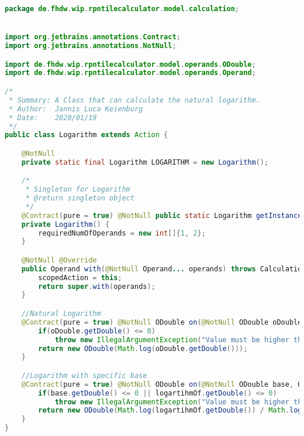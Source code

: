 \begin{lstlisting}[caption=Logarithm (Keienburg),label=list:Logarithm,language=Java]
package de.fhdw.wip.rpntilecalculator.model.calculation;


import org.jetbrains.annotations.Contract;
import org.jetbrains.annotations.NotNull;

import de.fhdw.wip.rpntilecalculator.model.operands.ODouble;
import de.fhdw.wip.rpntilecalculator.model.operands.Operand;

/*
 * Summary: A Class that can calculate the natural logarithm.
 * Author:  Jannis Luca Keienburg
 * Date:    2020/01/19
 */
public class Logarithm extends Action {

    @NotNull
    private static final Logarithm LOGARITHM = new Logarithm();

    /*
     * Singleton for Logarithm
     * @return singleton object
     */
    @Contract(pure = true) @NotNull public static Logarithm getInstance() { return LOGARITHM; }
    private Logarithm() {
        requiredNumOfOperands = new int[]{1, 2};
    }

    @NotNull @Override
    public Operand with(@NotNull Operand... operands) throws CalculationException {
        scopedAction = this;
        return super.with(operands);
    }

    //Natural Logarithm
    @Contract(pure = true) @NotNull ODouble on(@NotNull ODouble oDouble) {
        if(oDouble.getDouble() <= 0)
            throw new IllegalArgumentException("Value must be higher than Zero.");
        return new ODouble(Math.log(oDouble.getDouble()));
    }

    //Logarithm with specific base
    @Contract(pure = true) @NotNull ODouble on(@NotNull ODouble base, ODouble logartihmOf) {
        if(base.getDouble() <= 0 || logartihmOf.getDouble() <= 0)
            throw new IllegalArgumentException("Value must be higher than Zero.");
        return new ODouble(Math.log(logartihmOf.getDouble()) / Math.log(base.getDouble()));
    }
}
\end{lstlisting}    

